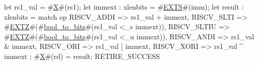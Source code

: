 let rs1_val = #\hyperref[sailRISCVzX]{X}#(rs1);
let immext : xlenbits = #\hyperref[sailRISCVzEXTS]{EXTS}#(imm);
let result : xlenbits = match op {
  RISCV_ADDI  => rs1_val + immext,
  RISCV_SLTI  => #\hyperref[sailRISCVzEXTZ]{EXTZ}#(#\hyperref[sailRISCVzboolzytozybits]{bool\_to\_bits}#(rs1_val <_s immext)),
  RISCV_SLTIU => #\hyperref[sailRISCVzEXTZ]{EXTZ}#(#\hyperref[sailRISCVzboolzytozybits]{bool\_to\_bits}#(rs1_val <_u immext)),
  RISCV_ANDI  => rs1_val & immext,
  RISCV_ORI   => rs1_val | immext,
  RISCV_XORI  => rs1_val ^ immext
};
#\hyperref[sailRISCVzX]{X}#(rd) = result;
RETIRE_SUCCESS
